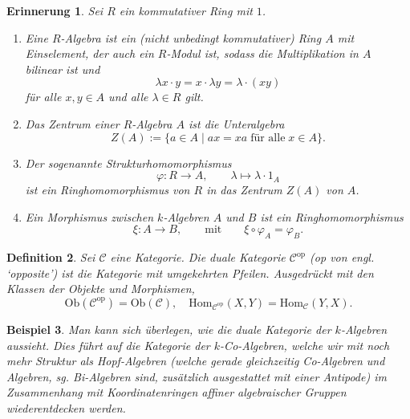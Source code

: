 \documentclass[a4paper, 11pt]{scrartcl}
\newcommand{\Hom}{\text{Hom}}
\newcommand{\Ob}{\text{Ob}}
\theoremstyle{basicstyle}
\newtheorem{definition}{Definition}[section]
\newtheorem{beispiel}[definition]{Beispiel}
\newtheorem{erinnerung}[definition]{Erinnerung}
\begin{document}
    \begin{erinnerung}
        Sei \(R\) ein kommutativer Ring mit \(1\).
        \begin{enumerate}
            \item Eine \emph{\(R\)-Algebra} ist ein (nicht unbedingt kommutativer) Ring \(A\) mit Einselement, der auch ein \(R\)-Modul ist, sodass die Multiplikation in \(A\) bilinear ist und
                \[\lambda x \cdot y = x \cdot \lambda y = \lambda \cdot (xy)\]
                für alle \(x,y \in A\) und alle \(\lambda \in R\) gilt.

            \item Das \emph{Zentrum} einer \(R\)-Algebra \(A\) ist die Unteralgebra
                \[Z(A) := \{a \in A \;\vert\; ax = xa \; \text{für alle} \; x \in A\}.\]

            \item Der sogenannte \emph{Strukturhomomorphismus} 
                \[\varphi: R \longrightarrow A, \qquad \lambda \mapsto \lambda \cdot 1_A\]
                ist ein Ringhomomorphismus von \(R\) in das Zentrum \(Z(A)\) von \(A\).

            \item Ein Morphismus zwischen \(k\)-Algebren \(A\) und \(B\) ist ein Ringhomomorphismus
                \[\xi: A \longrightarrow B, \qquad\text{mit}\qquad \xi \circ \varphi_A = \varphi_B.\]
        \end{enumerate}
    \end{erinnerung}

    \begin{definition}
        Sei \(\mathcal{C}\) eine Kategorie.
        Die \emph{duale Kategorie} \(\mathcal{C}^{\text{op}}\) (op von engl. `opposite') ist die Kategorie mit umgekehrten Pfeilen.
        Ausgedrückt mit den Klassen der Objekte und Morphismen,
        \[\Ob(\mathcal{C}^{\text{op}}) = \Ob(\mathcal{C}), \quad \Hom_{\mathcal{C}^{\text{op}}}(X, Y) = \Hom_{\mathcal{C}}(Y, X).\]
    \end{definition}

    \begin{beispiel}
        Man kann sich überlegen, wie die duale Kategorie der \(k\)-Algebren aussieht.
        Dies führt auf die Kategorie der \(k\)-Co-Algebren, welche wir mit noch mehr Struktur als Hopf-Algebren (welche gerade gleichzeitig Co-Algebren und Algebren, sg. Bi-Algebren sind, zusätzlich ausgestattet mit einer Antipode) im Zusammenhang mit Koordinatenringen affiner algebraischer Gruppen wiederentdecken werden.
    \end{beispiel}
\end{document}
